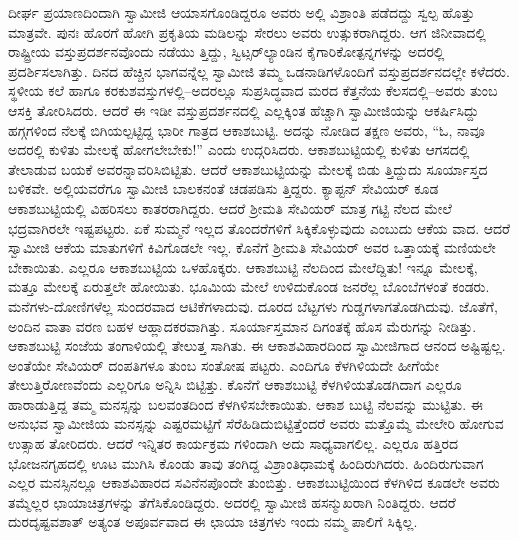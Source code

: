 ದೀರ್ಘ ಪ್ರಯಾಣದಿಂದಾಗಿ ಸ್ವಾಮೀಜಿ ಆಯಾಸಗೊಂಡಿದ್ದರೂ ಅವರು ಅಲ್ಲಿ ವಿಶ್ರಾಂತಿ ಪಡೆದದ್ದು ಸ್ವಲ್ಪ ಹೊತ್ತು ಮಾತ್ರವೇ. ಪುನಃ ಹೊರಗೆ ಹೋಗಿ ಪ್ರಕೃತಿಯ ಮಡಿಲನ್ನು ಸೇರಲು ಅವರು ಉತ್ಸುಕರಾಗಿದ್ದರು. ಆಗ ಜಿನೀವಾದಲ್ಲಿ ರಾಷ್ಟ್ರೀಯ ವಸ್ತುಪ್ರದರ್ಶನವೊಂದು ನಡೆಯು ತ್ತಿದ್ದು, ಸ್ವಿಟ್ಸರ್​ಲ್ಯಾಂಡಿನ ಕೈಗಾರಿಕೋತ್ಪನ್ನಗಳನ್ನು ಅದರಲ್ಲಿ ಪ್ರದರ್ಶಿಸಲಾಗಿತ್ತು. ದಿನದ ಹೆಚ್ಚಿನ ಭಾಗವನ್ನೆಲ್ಲ ಸ್ವಾಮೀಜಿ ತಮ್ಮ ಒಡನಾಡಿಗಳೊಂದಿಗೆ ವಸ್ತುಪ್ರದರ್ಶನದಲ್ಲೇ ಕಳೆದರು. ಸ್ಥಳೀಯ ಕಲೆ ಹಾಗೂ ಕರಕುಶವಸ್ತುಗಳಲ್ಲಿ–ಅದರಲ್ಲೂ ಸುಪ್ರಸಿದ್ಧವಾದ ಮರದ ಕೆತ್ತನೆಯ ಕೆಲಸದಲ್ಲಿ–ಅವರು ತುಂಬ ಆಸಕ್ತಿ ತೋರಿಸಿದರು. ಆದರೆ ಈ ಇಡೀ ವಸ್ತುಪ್ರದರ್ಶನದಲ್ಲಿ ಎಲ್ಲಕ್ಕಿಂತ ಹೆಚ್ಚಾಗಿ ಸ್ವಾಮೀಜಿಯನ್ನು ಆಕರ್ಷಿಸಿದ್ದು ಹಗ್ಗಗಳಿಂದ ನೆಲಕ್ಕೆ ಬಿಗಿಯಲ್ಪಟ್ಟಿದ್ದ ಭಾರೀ ಗಾತ್ರದ ಆಕಾಶಬುಟ್ಟಿ. ಅದನ್ನು ನೋಡಿದ ತಕ್ಷಣ ಅವರು, “ಓ, ನಾವೂ ಅದರಲ್ಲಿ ಕುಳಿತು ಮೇಲಕ್ಕೆ ಹೋಗಲೇಬೇಕು!” ಎಂದು ಉದ್ಗರಿಸಿದರು. ಆಕಾಶಬುಟ್ಟಿಯಲ್ಲಿ ಕುಳಿತು ಆಗಸದಲ್ಲಿ ತೇಲಾಡುವ ಬಯಕೆ ಅವರನ್ನಾವರಿಸಿಬಿಟ್ಟಿತು. ಆದರೆ ಆಕಾಶಬುಟ್ಟಿಯನ್ನು ಮೇಲಕ್ಕೆ ಬಿಡು ತ್ತಿದ್ದುದು ಸೂರ್ಯಾಸ್ತದ ಬಳಿಕವೇ. ಅಲ್ಲಿಯವರೆಗೂ ಸ್ವಾಮೀಜಿ ಬಾಲಕನಂತೆ ಚಡಪಡಿಸು ತ್ತಿದ್ದರು. ಕ್ಯಾಪ್ಟನ್ ಸೇವಿಯರ್ ಕೂಡ ಆಕಾಶಬುಟ್ಟಿಯಲ್ಲಿ ವಿಹರಿಸಲು ಕಾತರರಾಗಿದ್ದರು. ಆದರೆ ಶ್ರೀಮತಿ ಸೇವಿಯರ್ ಮಾತ್ರ ಗಟ್ಟಿ ನೆಲದ ಮೇಲೆ ಭದ್ರವಾಗಿರಲೇ ಇಷ್ಟಪಟ್ಟರು. ಏಕೆ ಸುಮ್ಮನೆ ಇಲ್ಲದ ತೊಂದರೆಗಳಿಗೆ ಸಿಕ್ಕಿಕೊಳ್ಳುವುದು ಎಂಬುದು ಆಕೆಯ ವಾದ. ಆದರೆ ಸ್ವಾಮೀಜಿ ಆಕೆಯ ಮಾತುಗಳಿಗೆ ಕಿವಿಗೊಡಲೇ ಇಲ್ಲ. ಕೊನೆಗೆ ಶ್ರೀಮತಿ ಸೇವಿಯರ್ ಅವರ ಒತ್ತಾಯಕ್ಕೆ ಮಣಿಯಲೇ ಬೇಕಾಯಿತು. ಎಲ್ಲರೂ ಆಕಾಶಬುಟ್ಟಿಯ ಒಳಹೊಕ್ಕರು. ಆಕಾಶಬುಟ್ಟಿ ನೆಲದಿಂದ ಮೇಲೆದ್ದಿತು! ಇನ್ನೂ ಮೇಲಕ್ಕೆ, ಮತ್ತೂ ಮೇಲಕ್ಕೆ ಏರುತ್ತಲೇ ಹೋಯಿತು. ಭೂಮಿಯ ಮೇಲೆ ಉಳಿದುಕೊಂಡ ಜನರೆಲ್ಲ ಬೊಂಬೆಗಳಂತೆ ಕಂಡರು. ಮನೆಗಳು-ದೋಣಿಗಳೆಲ್ಲ ಸುಂದರವಾದ ಆಟಿಕೆಗಳಾದುವು. ದೂರದ ಬೆಟ್ಟಗಳು ಗುಡ್ಡಗಳಾಗತೊಡಗಿದುವು. ಜೊತೆಗೆ, ಅಂದಿನ ವಾತಾ ವರಣ ಬಹಳ ಆಹ್ಲಾದಕರವಾಗಿತ್ತು. ಸೂರ್ಯಾಸ್ತಮಾನ ದಿಗಂತಕ್ಕೆ ಹೊಸ ಮೆರುಗನ್ನು ನೀಡಿತ್ತು. ಆಕಾಶಬುಟ್ಟಿ ಸಂಜೆಯ ತಂಗಾಳಿಯಲ್ಲಿ ತೇಲುತ್ತ ಸಾಗಿತು. ಈ ಆಕಾಶವಿಹಾರದಿಂದ ಸ್ವಾಮೀಜಿಗಾದ ಆನಂದ ಅಷ್ಟಿಷ್ಟಲ್ಲ. ಅಂತೆಯೇ ಸೇವಿಯರ್ ದಂಪತಿಗಳೂ ತುಂಬ ಸಂತೋಷ ಪಟ್ಟರು. ಎಂದಿಗೂ ಕೆಳಗಿಳಿಯದೇ ಹೀಗೆಯೇ ತೇಲುತ್ತಿರೋಣವೆಂದು ಎಲ್ಲರಿಗೂ ಅನ್ನಿಸಿ ಬಿಟ್ಟಿತ್ತು. ಕೊನೆಗೆ ಆಕಾಶಬುಟ್ಟಿ ಕೆಳಗಿಳಿಯತೊಡಗಿದಾಗ ಎಲ್ಲರೂ ಹಾರಾಡುತ್ತಿದ್ದ ತಮ್ಮ ಮನಸ್ಸನ್ನು ಬಲವಂತದಿಂದ ಕೆಳಗಿಳಿಸಬೇಕಾಯಿತು. ಆಕಾಶ ಬುಟ್ಟಿ ನೆಲವನ್ನು ಮುಟ್ಟಿತು. ಈ ಅನುಭವ ಸ್ವಾಮೀಜಿಯ ಮನಸ್ಸನ್ನು ಎಷ್ಟರಮಟ್ಟಿಗೆ ಸೆರೆಹಿಡಿದುಬಿಟ್ಟಿತ್ತೆಂದರೆ ಅವರು ಮತ್ತೊಮ್ಮೆ ಮೇಲೇರಿ ಹೋಗುವ ಉತ್ಸಾಹ ತೋರಿದರು. ಆದರೆ ಇನ್ನಿತರ ಕಾರ್ಯಕ್ರಮ ಗಳಿಂದಾಗಿ ಅದು ಸಾಧ್ಯವಾಗಲಿಲ್ಲ. ಎಲ್ಲರೂ ಹತ್ತಿರದ ಭೋಜನಗೃಹದಲ್ಲಿ ಊಟ ಮುಗಿಸಿ ಕೊಂಡು ತಾವು ತಂಗಿದ್ದ ವಿಶ್ರಾಂತಿಧಾಮಕ್ಕೆ ಹಿಂದಿರುಗಿದರು. ಹಿಂದಿರುಗುವಾಗ ಎಲ್ಲರ ಮನಸ್ಸಿನಲ್ಲೂ ಆಕಾಶವಿಹಾರದ ಸವಿನೆನಪೊಂದೇ ತುಂಬಿತ್ತು. ಆಕಾಶಬುಟ್ಟಿಯಿಂದ ಕೆಳಗಿಳಿದ ಕೂಡಲೇ ಅವರು ತಮ್ಮೆಲ್ಲರ ಛಾಯಾಚಿತ್ರಗಳನ್ನು ತೆಗೆಸಿಕೊಂಡಿದ್ದರು. ಅದರಲ್ಲಿ ಸ್ವಾಮೀಜಿ ಹಸನ್ಮುಖರಾಗಿ ನಿಂತಿದ್ದರು. ಆದರೆ ದುರದೃಷ್ಟವಶಾತ್ ಅತ್ಯಂತ ಅಪೂರ್ವವಾದ ಈ ಛಾಯಾ ಚಿತ್ರಗಳು ಇಂದು ನಮ್ಮ ಪಾಲಿಗೆ ಸಿಕ್ಕಿಲ್ಲ.

